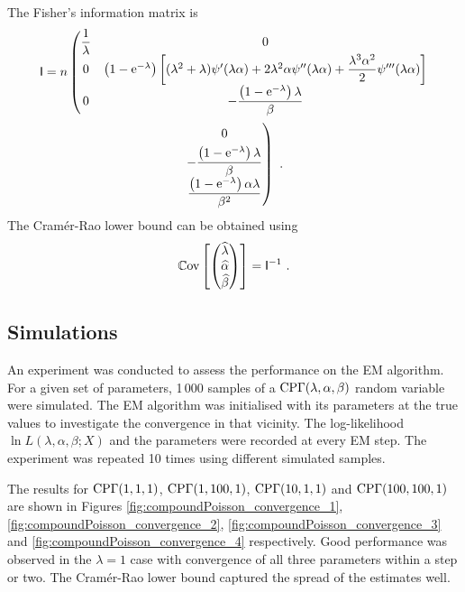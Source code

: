 The Fisher's information matrix is
\begin{multline}
  \matr{I}=
  n
  \left(\begin{matrix}
    \dfrac{1}{\lambda} & 0\\
    0 & \left(1-\euler^{-\lambda}\right)\left[(\lambda^2+\lambda)\psi'(\lambda\alpha)+2\lambda^2\alpha\psi''(\lambda\alpha)+\dfrac{\lambda^3\alpha^2}{2}\psi'''(\lambda\alpha)\right]\\
    0 & -\dfrac{\left(1-\euler^{-\lambda}\right)\lambda}{\beta}
  \end{matrix}\right.
  \\
  \left.\begin{matrix}
  \vphantom{\dfrac{1}{\lambda}}0\\
  -\dfrac{\left(1-\euler^{-\lambda}\right)\lambda}{\beta}\\
  \dfrac{\left(1-\euler^{-\lambda}\right)\alpha\lambda}{\beta^2}
  \end{matrix}\right)
  \ .
\end{multline}
The Cram\'er-Rao lower bound can be obtained using
\begin{equation}
  \operatorname{\mathbb{C}ov}\left[
    \begin{pmatrix}
      \widehat{\lambda}\\\widehat{\alpha}\\\widehat{\beta}
    \end{pmatrix}
  \right]
  =
  \mathsf{I}^{-1}
  \ .
\end{equation}

\subsection{Simulations}

An experiment was conducted to assess the performance on the EM algorithm. For a given set of parameters, 1\,000 samples of a $\operatorname{CP\Gamma}(\lambda,\alpha,\beta)$ random variable were simulated. The EM algorithm was initialised with its parameters at the true values to investigate the convergence in that vicinity. The log-likelihood $\ln L(\lambda,\alpha,\beta;X)$ and the parameters were recorded at every EM step. The experiment was repeated 10 times using different simulated samples.

The results for $\operatorname{CP\Gamma}(1,1,1)$, $\operatorname{CP\Gamma}(1,100,1)$, $\operatorname{CP\Gamma}(10,1,1)$ and $\operatorname{CP\Gamma}(100,100,1)$ are shown in Figures \ref{fig:compoundPoisson_convergence_1}, \ref{fig:compoundPoisson_convergence_2}, \ref{fig:compoundPoisson_convergence_3} and \ref{fig:compoundPoisson_convergence_4} respectively. Good performance was observed in the $\lambda=1$ case with convergence of all three parameters within a step or two. The Cram\'er-Rao lower bound captured the spread of the estimates well.

